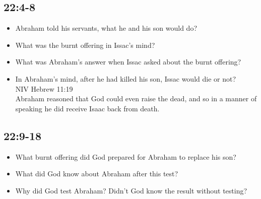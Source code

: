 \subsection{22:4-8}
\begin{itemize}
\item Abraham told his servants, what he and his son would do?
\item What was the burnt offering in Issac's mind?
\item What was Abraham's answer when Issac asked about the burnt offering?
\item In Abraham's mind, after he had killed his son, Issac would die or not?\\
NIV Hebrew 11:19\\
Abraham reasoned that God could even raise the dead, and so in a manner of speaking he did receive Isaac back from death.
\end{itemize}
\subsection{22:9-18}
\begin{itemize}
\item What burnt offering did God prepared for Abraham to replace his son?
\item What did God know about Abraham after this test?
\item Why did God test Abraham? Didn't God know the result without testing?
\end{itemize}